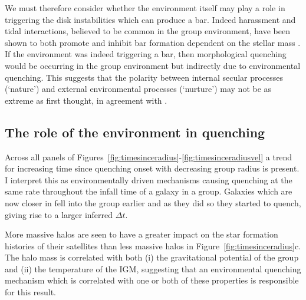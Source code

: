 We must therefore consider whether the environment itself may play a role in triggering the disk instabilities which can produce a bar. Indeed harassment and tidal interactions, believed to be common in the group environment, have been shown to both promote and inhibit bar formation dependent on the stellar mass \citep{noguchi88, moore96, skibba12}.  If the environment was indeed triggering a bar, then morphological quenching would be occurring in the group environment but indirectly due to environmental quenching. This suggests that the polarity between internal secular processes (`nature') and external environmental processes (`nurture') may not be as extreme as first thought, in agreement with \cite{skibba12}. 

\subsection{The role of the environment in quenching}\label{sec:roleenv}

Across all panels of Figures~\ref{fig:timesinceradius}-\ref{fig:timesinceradiusvel} a trend for increasing time since quenching onset with decreasing group radius is present. I interpret this as environmentally driven mechanisms causing quenching at the same rate throughout the infall time of a galaxy in a group. Galaxies which are now closer in fell into the group earlier and as they did so they started to quench, giving rise to a larger inferred $\Delta t$.

More massive halos are seen to have a greater impact on the star formation histories of their satellites than less massive halos in Figure~\ref{fig:timesinceradius}c. The halo mass is correlated with both (i) the gravitational potential of the group and (ii) the temperature of the IGM, suggesting that an environmental quenching mechanism which is correlated with one or both of these properties is responsible for this result.

